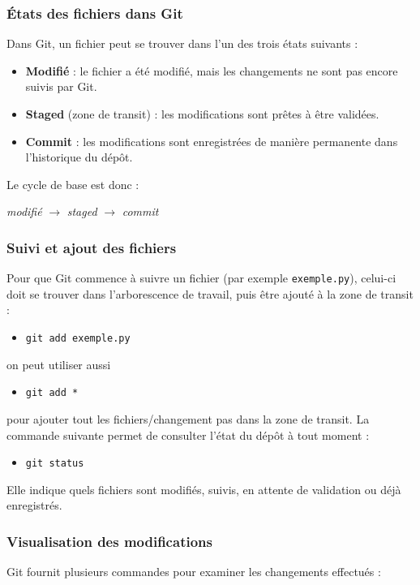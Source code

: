 \documentclass{article}
\begin{document}
\subsubsection{États des fichiers dans Git}
Dans Git, un fichier peut se trouver dans l’un des trois états suivants :
\begin{itemize}
    \item \textbf{Modifié} : le fichier a été modifié, mais les changements ne sont pas encore suivis par Git.
    \item \textbf{Staged} (zone de transit) : les modifications sont prêtes à être validées.
    \item \textbf{Commit} : les modifications sont enregistrées de manière permanente dans l’historique du dépôt.
\end{itemize}
Le cycle de base est donc :
\begin{center}
\emph{modifié} $\rightarrow$ \emph{staged} $\rightarrow$ \emph{commit}
\end{center}

\subsubsection{Suivi et ajout des fichiers}
Pour que Git commence à suivre un fichier (par exemple \texttt{exemple.py}), celui-ci doit se trouver dans l’arborescence de travail, puis être ajouté à la zone de transit :
\begin{itemize}
    \item \texttt{git add exemple.py}
\end{itemize}
on peut utiliser aussi
\begin{itemize}
    \item \texttt{git add *}
\end{itemize}
pour ajouter tout les fichiers/changement pas dans la zone de transit.
La commande suivante permet de consulter l’état du dépôt à tout moment :
\begin{itemize}
    \item \texttt{git status}
\end{itemize}
Elle indique quels fichiers sont modifiés, suivis, en attente de validation ou déjà enregistrés.

\subsubsection{Visualisation des modifications}
Git fournit plusieurs commandes pour examiner les changements effectués :
\end{document}
